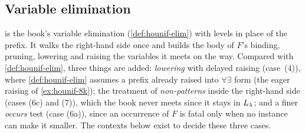 \subsection{Variable elimination}

 is the book's variable elimination  (\cref{def:hounif-elim}) with levels in place of the
prefix. It walks the right-hand side once and builds the body of $F$'s binding, pruning, lowering and raising the
variables it meets on the way. Compared with \cref{def:hounif-elim}, three things are added: \emph{lowering}
with delayed raising (case~(4)), where \cref{def:hounif-elim} assumes a prefix already raised into
$\forall\exists$ form (the eager raising of \cref{ex:hounif-8k}); the treatment of \emph{non-patterns} inside the right-hand side (cases (6c) and (7)), which the book never meets since
it stays in $L_\lambda$; and a finer \emph{occurs} test (case (6a)), since an occurrence of $F$ is fatal only when no
instance can make it smaller. The contexts below exist to decide these three cases.

